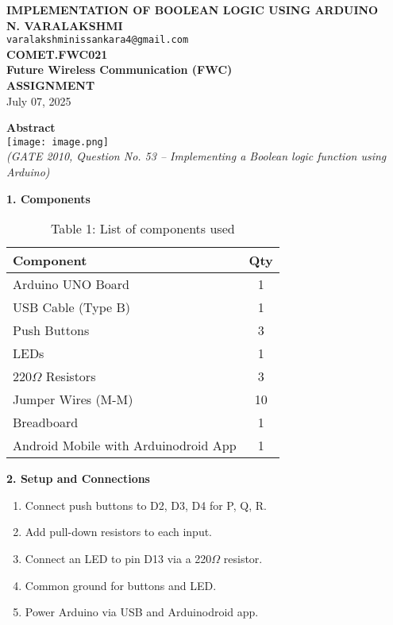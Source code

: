 \documentclass[12pt]{article}
\begin{document}
\begin{center}
    \textbf{\Large IMPLEMENTATION OF BOOLEAN LOGIC USING ARDUINO} \\[10pt]
    \textbf{N. VARALAKSHMI} \\
    \texttt{varalakshminissankara4@gmail.com} \\
    \textbf{COMET.FWC021} \\
    \textbf{Future Wireless Communication (FWC)} \\
    \textbf{ASSIGNMENT} \\[5pt]
    July 07, 2025
\end{center}
\vspace{1em}

\begin{multicols}{2}

\noindent\textbf{Abstract} \\[0.5em]
\texttt{[image: image.png]} \\[0.5em]
\textit{(GATE 2010, Question No. 53 – Implementing a Boolean logic function using Arduino)}

\vspace{1em}
\noindent\textbf{1. Components}
\begin{table}[H]
\small
\centering
\begin{tabular}{|p{4.2cm}|c|}
\hline
\textbf{Component} & \textbf{Qty} \\
\hline
Arduino UNO Board & 1 \\
USB Cable (Type B) & 1 \\
Push Buttons & 3 \\
LEDs & 1 \\
220$\Omega$ Resistors & 3 \\
Jumper Wires (M-M) & 10 \\
Breadboard & 1 \\
Android Mobile with Arduinodroid App & 1 \\
\hline
\end{tabular}
\caption*{Table 1: List of components used}
\end{table}

\vspace{1em}
\noindent\textbf{2. Setup and Connections}
\begin{enumerate}
    \item Connect push buttons to D2, D3, D4 for P, Q, R.
    \item Add pull-down resistors to each input.
    \item Connect an LED to pin D13 via a 220$\Omega$ resistor.
    \item Common ground for buttons and LED.
    \item Power Arduino via USB and Arduinodroid app.
\end{enumerate}


\end{multicols}
\end{document}
